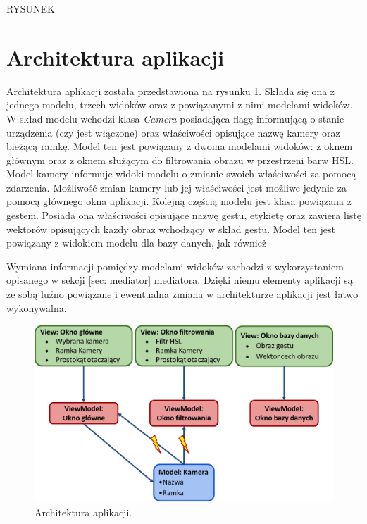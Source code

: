 RYSUNEK





\section{Architektura aplikacji}
Architektura aplikacji została przedstawiona na rysunku \ref{im: AppArchitectureWithHsl}. Składa się ona z jednego modelu, trzech widoków oraz z powiązanymi z nimi modelami widoków. W skład modelu wchodzi klasa \textit{Camera} posiadająca flagę informującą o stanie urządzenia (czy jest włączone) oraz właściwości opisujące nazwę kamery oraz bieżącą ramkę. Model ten jest powiązany z dwoma modelami widoków: z oknem głównym oraz z oknem służącym do filtrowania obrazu w przestrzeni barw HSL. Model kamery informuje widoki modelu o zmianie swoich właściwości za pomocą zdarzenia. Możliwość zmian kamery lub jej właściwości jest możliwe jedynie za pomocą głównego okna aplikacji. Kolejną częścią modelu jest klasa powiązana z gestem. Posiada ona właściwości opisujące nazwę gestu, etykietę oraz zawiera listę wektorów opisujących każdy obraz wchodzący w skład gestu. Model ten jest powiązany z widokiem modelu dla bazy danych, jak również 

Wymiana informacji pomiędzy modelami widoków zachodzi z wykorzystaniem opisanego w sekcji \ref{sec: mediator} mediatora. Dzięki niemu elementy aplikacji są ze sobą luźno powiązane i ewentualna zmiana w architekturze aplikacji jest łatwo wykonywalna. 
\begin{figure}[h]
	\centering
	\includegraphics[width=16cm]{AppArchitectureWithHsl}
	\centering
	\caption{Architektura aplikacji.}
	\label{im: AppArchitectureWithHsl}
\end{figure}

